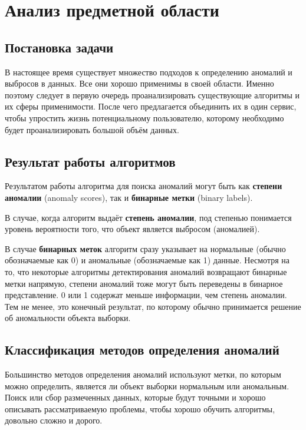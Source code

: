 \chapter{Анализ предметной области} \label{ch:ch1}

\section{Постановка задачи} \label{sec:ch1/sec1}

В настоящее время существует множество подходов к определению аномалий и выбросов в данных. Все они хорошо применимы в своей области. Именно поэтому следует в первую очередь проанализировать существующие алгоритмы и их сферы применимости. После чего предлагается объединить их в один сервис, чтобы упростить жизнь потенциальному пользователю, которому необходимо будет проанализировать большой объём данных.

\section{Результат работы алгоритмов} \label{sec:ch1/sec2}

Результатом работы алгоритма для поиска аномалий могут быть как \textbf{степени аномалии} (anomaly scores), так и \textbf{бинарные метки} (binary labels).

В случае, когда алгоритм выдаёт \textbf{степень аномалии}, под степенью понимается уровень вероятности того, что объект является выбросом (аномалией).

В случае \textbf{бинарных меток} алгоритм сразу указывает на нормальные (обычно обозначаемые как 0) и аномальные (обозначаемые как 1) данные. Несмотря на то, что некоторые алгоритмы детектирования аномалий возвращают бинарные метки напрямую, степени аномалий тоже могут быть переведены в бинарное представление. 0 или 1 содержат меньше информации, чем степень аномалии. Тем не менее, это конечный результат, по которому обычно принимается решение об аномальности объекта выборки.

\section{Классификация методов определения аномалий} \label{sec:ch1/sec3}

Большинство методов определения аномалий используют метки, по которым можно определить, является ли объект выборки нормальным или аномальным. Поиск или сбор размеченных данных, которые будут точными и хорошо описывать рассматриваемую проблемы, чтобы хорошо обучить алгоритмы, довольно сложно и дорого.

